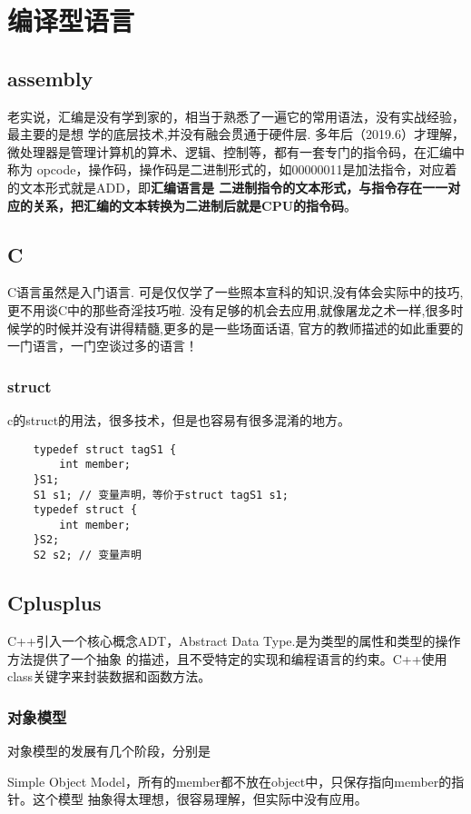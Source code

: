 \section{编译型语言}

\subsection{assembly}
老实说，汇编是没有学到家的，相当于熟悉了一遍它的常用语法，没有实战经验，最主要的是想
学的底层技术,并没有融会贯通于硬件层.
\newline
多年后（2019.6）才理解，微处理器是管理计算机的算术、逻辑、控制等，都有一套专门的指令码，在汇编中称为
opcode，操作码，操作码是二进制形式的，如00000011是加法指令，对应着的文本形式就是ADD，即\textbf{汇编语言是
二进制指令的文本形式，与指令存在一一对应的关系，把汇编的文本转换为二进制后就是CPU的指令码}。

\subsection{C}
C语言虽然是入门语言. 可是仅仅学了一些照本宣科的知识,没有体会实际中的技巧,更不用谈C中的那些奇淫技巧啦.
没有足够的机会去应用,就像屠龙之术一样,很多时候学的时候并没有讲得精髓,更多的是一些场面话语,
官方的教师描述的如此重要的一门语言，一门空谈过多的语言！
\subsubsection{struct}
c的struct的用法，很多技术，但是也容易有很多混淆的地方。
\begin{lstlisting}
    typedef struct tagS1 {
        int member;
    }S1;
    S1 s1; // 变量声明，等价于struct tagS1 s1;
    typedef struct {
        int member;
    }S2;
    S2 s2; // 变量声明
\end{lstlisting}

\subsection{Cplusplus}
C++引入一个核心概念ADT，Abstract Data Type.是为类型的属性和类型的操作方法提供了一个抽象
的描述，且不受特定的实现和编程语言的约束。C++使用class关键字来封装数据和函数方法。

\subsubsection{对象模型}
对象模型的发展有几个阶段，分别是

Simple Object Model，所有的member都不放在object中，只保存指向member的指针。这个模型
抽象得太理想，很容易理解，但实际中没有应用。


